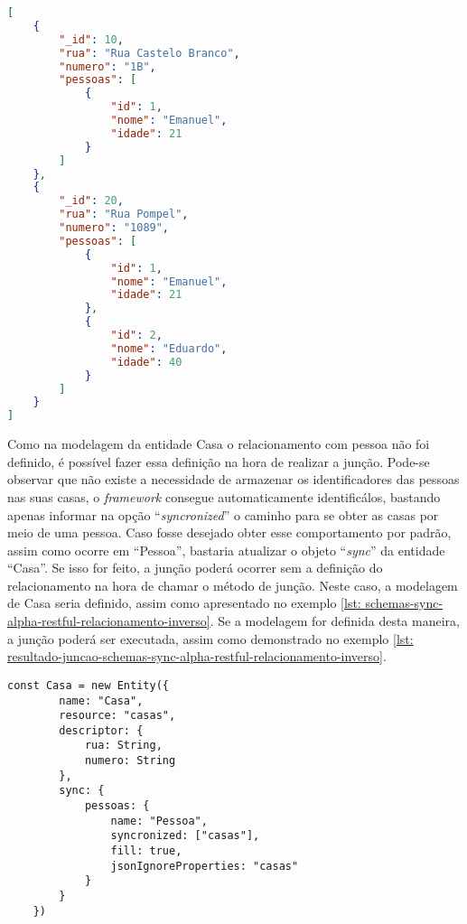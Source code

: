 \begin{lstlisting}[language=json, caption={Resultado da Junção de Documentos em ``Casa''\label{lst: resultado-juncao-alpha-restful-relacionamento-inverso}}]
[
    {
        "_id": 10,
        "rua": "Rua Castelo Branco",
        "numero": "1B",
        "pessoas": [
            {
                "id": 1,
                "nome": "Emanuel",
                "idade": 21
            }
        ]
    },
    {
        "_id": 20,
        "rua": "Rua Pompel",
        "numero": "1089",
        "pessoas": [
            {
                "id": 1,
                "nome": "Emanuel",
                "idade": 21
            },
            {
                "id": 2,
                "nome": "Eduardo",
                "idade": 40
            }
        ]
    }
]
\end{lstlisting}

Como na modelagem da entidade Casa o relacionamento com pessoa não foi definido, é possível fazer essa definição na hora de realizar a junção. Pode-se observar que não existe a necessidade de armazenar os identificadores das pessoas nas suas casas, o \textit{framework} consegue automaticamente identificálos, bastando apenas informar na opção ``\textit{syncronized}'' o caminho para se obter as casas por meio de uma pessoa. Caso fosse desejado obter esse comportamento por padrão, assim como ocorre em ``Pessoa'', bastaria atualizar o objeto ``\textit{sync}'' da entidade ``Casa''. Se isso for feito, a junção poderá ocorrer sem a definição do relacionamento na hora de chamar o método de junção. Neste caso, a modelagem de Casa seria definido, assim como apresentado no exemplo \ref{lst: schemas-sync-alpha-restful-relacionamento-inverso}. Se a modelagem for definida desta maneira, a junção poderá ser executada, assim como demonstrado no exemplo \ref{lst: resultado-juncao-schemas-sync-alpha-restful-relacionamento-inverso}.

\begin{lstlisting}[style=ES6, caption={Relacionamento Inverso em \textit{Schema} de Casa\label{lst: schemas-sync-alpha-restful-relacionamento-inverso}}]
    const Casa = new Entity({
        name: "Casa",
        resource: "casas",
        descriptor: {
            rua: String,
            numero: String
        },
        sync: {
            pessoas: {
                name: "Pessoa",
                syncronized: ["casas"],
                fill: true,
                jsonIgnoreProperties: "casas"
            }
        }
    })
\end{lstlisting}

